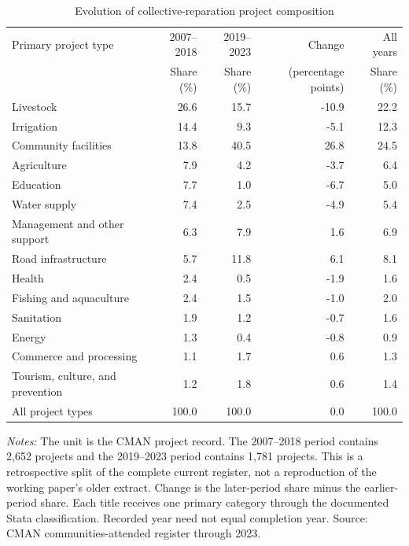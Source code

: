 \begin{table}[!htbp]
\centering
\caption{Evolution of collective-reparation project composition}
\label{tab:desc_project_composition_periods}
\begin{tabular}{lrrrr}
\toprule
Primary project type & 2007--2018 & 2019--2023 & Change & All years \\
 & Share (\%) & Share (\%) & (percentage points) & Share (\%) \\
\midrule
Livestock & 26.6 & 15.7 & -10.9 & 22.2 \\
Irrigation & 14.4 & 9.3 & -5.1 & 12.3 \\
Community facilities & 13.8 & 40.5 & 26.8 & 24.5 \\
Agriculture & 7.9 & 4.2 & -3.7 & 6.4 \\
Education & 7.7 & 1.0 & -6.7 & 5.0 \\
Water supply & 7.4 & 2.5 & -4.9 & 5.4 \\
Management and other support & 6.3 & 7.9 & 1.6 & 6.9 \\
Road infrastructure & 5.7 & 11.8 & 6.1 & 8.1 \\
Health & 2.4 & 0.5 & -1.9 & 1.6 \\
Fishing and aquaculture & 2.4 & 1.5 & -1.0 & 2.0 \\
Sanitation & 1.9 & 1.2 & -0.7 & 1.6 \\
Energy & 1.3 & 0.4 & -0.8 & 0.9 \\
Commerce and processing & 1.1 & 1.7 & 0.6 & 1.3 \\
Tourism, culture, and prevention & 1.2 & 1.8 & 0.6 & 1.4 \\
\midrule
All project types & 100.0 & 100.0 & 0.0 & 100.0 \\
\bottomrule
\end{tabular}
\parbox{0.98\linewidth}{\footnotesize \textit{Notes:} The unit is the CMAN project record. The 2007--2018 period contains 2,652 projects and the 2019--2023 period contains 1,781 projects. This is a retrospective split of the complete current register, not a reproduction of the working paper's older extract. Change is the later-period share minus the earlier-period share. Each title receives one primary category through the documented Stata classification. Recorded year need not equal completion year. Source: CMAN communities-attended register through 2023.}
\end{table}
